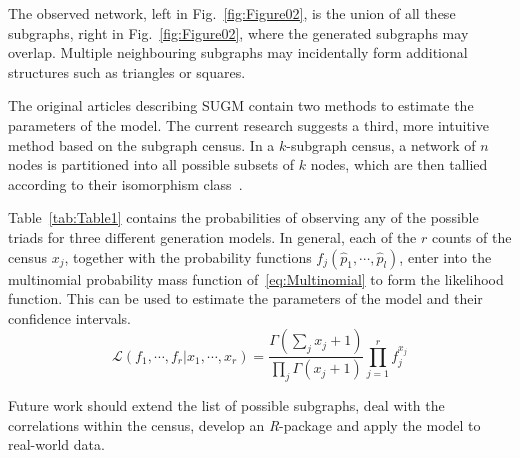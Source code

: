 \documentclass[conference]{IEEEtran}
\begin{document}
The observed network, left in Fig.~\ref{fig:Figure02}, is the union of all these subgraphs, right in Fig.~\ref{fig:Figure02}, where the generated subgraphs may overlap. Multiple neighbouring subgraphs may incidentally form additional structures such as triangles or squares.

The original articles describing SUGM contain two methods to estimate the parameters of the model. The current research suggests a third, more intuitive method based on the subgraph census. In a $k$-subgraph census, a network of $n$ nodes is partitioned into all possible subsets of $k$ nodes, which are then tallied according to their isomorphism class~\cite{Davis1972,Holland1970,Holland1976}.

Table~\ref{tab:Table1} contains the probabilities of observing any of the possible triads for three different generation models. In general, each of the $r$ counts of the census $x_{j}$, together with the probability functions $f_{j}(\hat{p}_{1},\cdots,\hat{p}_{l})$, enter into the multinomial probability mass function of~\eqref{eq:Multinomial} to form the likelihood function. This can be used to estimate the parameters of the model and their confidence intervals.
\begin{equation}
\mathcal{L}(f_{1}, \cdots, f_{r} | x_{1}, \cdots, x_{r}) = \frac{\Gamma(\sum_{j} x_{j}+1)}{\prod_{j} \Gamma(x_{j}+1)} \prod_{j=1}^{r} f_{j}^{x_{j}}
\label{eq:Multinomial}
\end{equation}

Future work should extend the list of possible subgraphs, deal with the correlations within the census, develop an \mbox{\textit{R}-package} and apply the model to real-world data.



\end{document}
